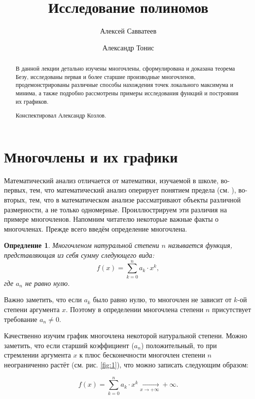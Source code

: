 \documentclass[12pt]{article}
\title{Исследование полиномов}
\author{Алексей Савватеев \and Александр Тонис}
\newtheorem{definition}{Опредление}[section]
\begin{document}
\maketitle
\begin{abstract}
В данной лекции детально изучены многочлены, сформулирована и доказана теорема Безу, исследованы первая и более старшие производные многочленов, продемонстрированы различные способы нахождения точек локального максимума и минима, а также подробно рассмотрены примеры исследования функций и построяния их графиков.
\par
Конспектировал Александр Козлов. 
\end{abstract}
\newpage
\tableofcontents
\newpage
\section{Многочлены и их графики}
Математический анализ отличается от математики, изучаемой в школе, во\--первых, тем, что математический анализ оперирует понятием предела (см. \cite{lim_use}), во\--вторых, тем, что в математическом анализе рассматривают объекты различной размерности, а не только одномерные. Проиллюстрируем эти различия на примере многочленов. Напомним читателю некоторые важные факты о многочленах. Прежде всего введём определение многочлена.

\begin{definition}
	Многочленом натуральной степени $n$ называется функция, представляющая из себя сумму следующего вида:
	\begin{equation}
	f(x) = \sum_{k=0}^n{a_k \cdot x^k},
	\end{equation}
	где $a_n$ не равно нулю.
\end{definition}

Важно заметить, что если $a_k$ было равно нулю, то многочлен не зависит от $k$\--ой степени аргумента $x$. Поэтому в определении многочлена степени $n$ присутствует требование $a_n \ne 0$.

\par
Качественно изучим график многочлена некоторой натуральной степени. Можно заметить, что если старший коэффициент ($a_n$) положительный, то при стремлении аргумента $x$ к плюс бесконечности многочлен степени $n$ неограниченно растёт (см. рис. \ref{fig:1}), что можно записать следующим образом:

\begin{equation}
f(x) = \sum_{k=0}^n{a_k \cdot x^k} \underset{x\rightarrow+\infty}{\longrightarrow}+\infty.
\end{equation}
\end{document}
